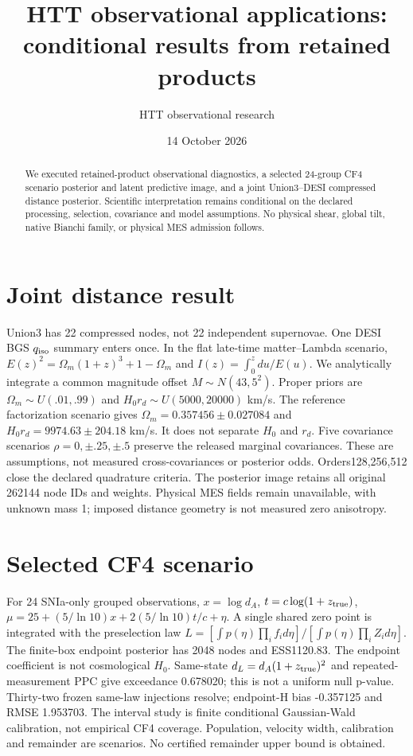 \documentclass[10pt]{article}
\title{HTT observational applications: conditional results from retained products}
\author{HTT observational research}\date{14 October 2026}
\begin{document}
\maketitle
\begin{abstract}
We executed retained-product observational diagnostics, a selected 24-group CF4
scenario posterior and latent predictive image, and a joint Union3--DESI compressed
distance posterior. Scientific interpretation remains conditional on the declared
processing, selection, covariance and model assumptions. No physical shear, global
tilt, native Bianchi family, or physical MES admission follows.
\end{abstract}
\section{Joint distance result}
Union3 has 22 compressed nodes, not 22 independent supernovae. One DESI BGS
$q_{\rm iso}$ summary enters once. In the flat late-time matter--Lambda scenario,
$E(z)^2=\Omega_m(1+z)^3+1-\Omega_m$ and $I(z)=\int_0^z du/E(u)$.
We analytically integrate a common magnitude offset $M\sim N(43,5^2)$.
Proper priors are $\Omega_m\sim U(.01,.99)$ and $H_0r_d\sim U(5000,20000)$ km/s.
The reference factorization scenario gives $\Omega_m=0.357456\pm0.027084$ and
$H_0r_d=9974.63\pm204.18$ km/s. It does not separate $H_0$ and $r_d$.
Five covariance scenarios $\rho=0,\pm.25,\pm.5$ preserve the released marginal
covariances. These are assumptions, not measured cross-covariances or posterior odds.
Orders128,256,512 close the declared quadrature criteria. The posterior image retains
all original 262144 node IDs and weights. Physical MES fields remain unavailable,
with unknown mass 1; imposed distance geometry is not measured zero anisotropy.
\section{Selected CF4 scenario}
For 24 SNIa-only grouped observations, $x=\log d_A$, $t=c\log(1+z_{\rm true})$,
$\mu=25+(5/\ln10)x+2(5/\ln10)t/c+\eta$.
A single shared zero point is integrated with the preselection law
$L=[\int p(\eta)\prod_i f_i d\eta]/[\int p(\eta)\prod_i Z_i d\eta]$.
The finite-box endpoint posterior has 2048 nodes and ESS1120.83.
The endpoint coefficient is not cosmological $H_0$.
Same-state $d_L=d_A(1+z_{\rm true})^2$ and repeated-measurement PPC give
exceedance 0.678020; this is not a uniform null p-value. Thirty-two frozen same-law
injections resolve; endpoint-H bias -0.357125 and RMSE 1.953703.
The interval study is finite conditional Gaussian-Wald calibration, not empirical
CF4 coverage. Population, velocity width, calibration and remainder are scenarios.
No certified remainder upper bound is obtained.
\end{document}
